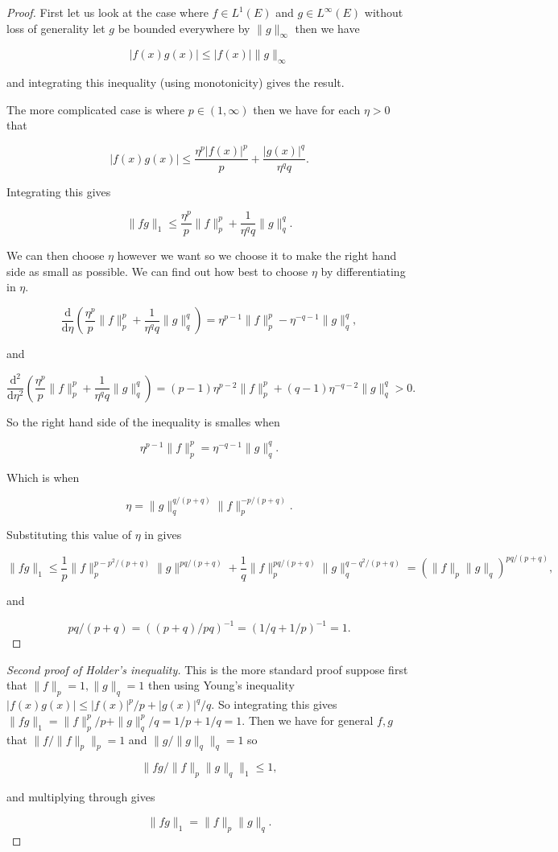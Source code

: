 \documentclass[
]{book}
\theoremstyle{definition}
\theoremstyle{definition}
\theoremstyle{definition}
\theoremstyle{definition}
\theoremstyle{remark}
\begin{document}
\begin{proof}
First let us look at the case where \(f \in L^1(E)\) and \(g \in L^\infty(E)\) without loss of generality let \(g\) be bounded everywhere by \(\|g\|_\infty\) then we have

\[ |f(x)g(x)| \leq |f(x)| \|g\|_\infty \]

and integrating this inequality (using monotonicity) gives the result.

The more complicated case is where \(p \in (1, \infty)\) then we have for each \(\eta >0\) that

\[ |f(x)g(x)| \leq \frac{\eta^p |f(x)|^p}{p} + \frac{|g(x)|^q}{\eta^q q}. \]

Integrating this gives

\[ \|fg\|_1 \leq \frac{\eta^p}{p} \|f\|_p^p + \frac{1}{\eta^q q} \|g\|_q^q. \]

We can then choose \(\eta\) however we want so we choose it to make the right hand side as small as possible. We can find out how best to choose \(\eta\) by differentiating in \(\eta\).

\[ \frac{\mathrm{d}}{\mathrm{d}\eta} \left(\frac{\eta^p}{p} \|f\|_p^p + \frac{1}{\eta^q q} \|g\|_q^q\right) = \eta^{p-1} \|f\|_p^p - \eta^{-q-1} \|g\|_q^q, \]

and

\[ \frac{\mathrm{d}^2}{\mathrm{d}\eta^2} \left(\frac{\eta^p}{p} \|f\|_p^p + \frac{1}{\eta^q q} \|g\|_q^q\right) = (p-1) \eta^{p-2} \|f\|_p^p + (q-1) \eta^{-q-2} \|g\|_q^q>0.\]

So the right hand side of the inequality is smalles when

\[ \eta^{p-1} \|f\|_p^p = \eta^{-q-1} \|g\|_q^q.  \]

Which is when

\[ \eta = \|g\|_q^{q/(p+q)} \|f\|_p^{-p/(p+q)}. \]

Substituting this value of \(\eta\) in gives

\[ \|fg\|_1 \leq \frac{1}{p} \|f\|_p^{p-p^2/(p+q)} \|g\|^{pq/(p+q)} + \frac{1}{q} \|f\|^{pq/(p+q)}_p \|g\|_q^{q-q^2/(p+q)} = \left(\|f\|_p \|g\|_q \right)^{pq/(p+q)},\]

and

\[ pq/(p+q) = \left( (p+q)/pq \right)^{-1} = \left( 1/q + 1/p \right)^{-1} = 1. \]
\end{proof}

\begin{proof}[Second proof of Holder's inequality]
This is the more standard proof suppose first that \(\|f\|_p =1, \|g\|_q = 1\) then using Young's inequality \(|f(x)g(x)| \leq |f(x)|^p/p + |g(x)|^q/q\). So integrating this gives \(\|fg\|_1 = \|f\|^p_p/p + \|g\|^p_q/q = 1/p + 1/q = 1\). Then we have for general \(f,g\) that \(\|f/\|f\|_p\|_p = 1\) and \(\|g/\|g\|_q\|_q = 1\) so

\[ \| fg/ \|f\|_p \|g\|_q\|_1 \leq 1,  \]

and multiplying through gives

\[ \|fg\|_1 = \|f\|_p \|g\|_q.\]
\end{proof}
\end{document}
